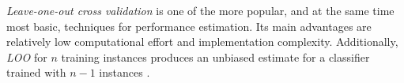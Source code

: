 \textit{Leave-one-out cross validation} is one of the more popular, and at the same time most basic, techniques for performance estimation. Its main advantages are relatively low computational effort and implementation complexity. Additionally, \textit{LOO} for $n$ training instances produces an unbiased estimate for a classifier trained with $n-1$ instances \cite{RodriguezEtAl2013}. 